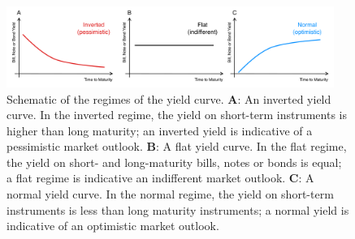 \documentclass[11pt]{article}
\theoremstyle{definition}
\begin{document}
\begin{figure}[h]
    \centering
    \includegraphics[width=0.95\textwidth]{./figs/Fig-YieldCurve-Schematic.pdf}
    \caption{Schematic of the regimes of the yield curve. 
	\textbf{A}: An inverted yield curve. In the inverted regime, the yield on short-term instruments is higher than long maturity; an inverted yield is indicative of a pessimistic market outlook.
	\textbf{B}: A flat yield curve. In the flat regime, the yield on short- and long-maturity bills, notes or bonds is equal; a flat regime is indicative an indifferent market outlook. 
	\textbf{C}: A normal yield curve. In the normal regime, the yield on short-term instruments is less than long maturity instruments; a normal yield is indicative of an optimistic market outlook. 
	}\label{fig:yield-curve-schematic}
\end{figure}
\end{document}
